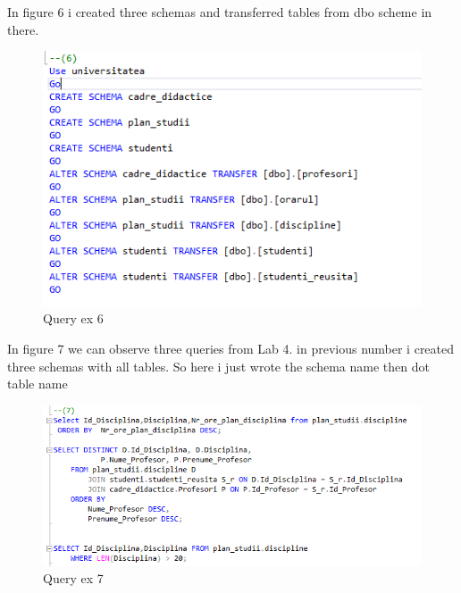 \documentclass[12pt]{article}
\begin{document}
        In figure 6 i created three schemas and transferred tables from dbo scheme in there. 
        \begin{figure}[H]
                \centering
                \includegraphics[width=\textwidth]{img6.png}
                \caption{Query ex 6}
        \end{figure}
        \vspace{0.5 cm}
        In figure 7 we can observe three queries from Lab 4. in previous number i created three schemas with all tables. So here i just wrote the schema name then dot table name
        \begin{figure}[H]
                \centering
                \includegraphics[width=\textwidth]{img7.png}
                \caption{Query ex 7}
        \end{figure}
        \vspace{0.5 cm}
\end{document}
